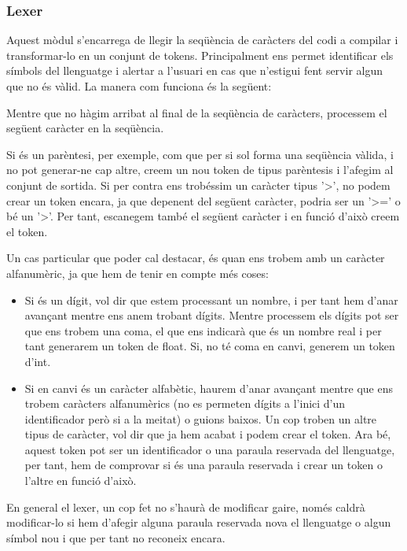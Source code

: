 ﻿\documentclass{article}
\begin{document}
\subsubsection{Lexer}
Aquest mòdul s'encarrega de llegir la seqüència de caràcters del codi a compilar
i transformar-lo en un conjunt de tokens. Principalment ens permet identificar
els símbols del llenguatge i alertar a l'usuari en cas que n'estigui fent servir
algun que no és vàlid. La manera com funciona és la següent:

Mentre que no hàgim arribat al final de la seqüència de caràcters, processem el
següent caràcter en la seqüència. 

Si és un parèntesi, per exemple, com que per si sol forma una seqüència vàlida,
i no pot generar-ne cap altre, creem un nou token de tipus parèntesis i l'afegim
al conjunt de sortida. Si per contra ens trobéssim un caràcter tipus '>', no
podem crear un token encara, ja que depenent del següent caràcter, podria ser un
'>=' o bé un '>'. Per tant, escanegem també el següent caràcter i en funció
d'això creem el token. 

Un cas particular que poder cal destacar, és quan ens trobem amb
un caràcter alfanumèric, ja que hem de tenir en compte més coses:

\begin{itemize}
\item
    Si és un dígit, vol dir que estem processant un nombre, i per tant hem
    d'anar avançant mentre ens anem trobant dígits. Mentre processem els dígits
    pot ser que ens trobem una coma, el que ens indicarà que és un nombre real i
    per tant generarem un token de float. Si, no té coma en canvi, generem un
    token d'int.
\item
    Si en canvi és un caràcter alfabètic, haurem d'anar avançant mentre que ens
    trobem caràcters alfanumèrics (no es permeten dígits a l'inici d'un
    identificador però si a la meitat) o guions baixos. Un cop troben un altre
    tipus de caràcter, vol dir que ja hem acabat i podem crear el token. Ara bé,
    aquest token pot ser un identificador o una paraula reservada del
    llenguatge, per tant, hem de comprovar si és una paraula reservada i crear
    un token o l'altre en funció d'això.
\end{itemize}

En general el lexer, un cop fet no s'haurà de modificar gaire, només caldrà
modificar-lo si hem d'afegir alguna paraula reservada nova el llenguatge o algun
símbol nou i que per tant no reconeix encara.
\end{document}

